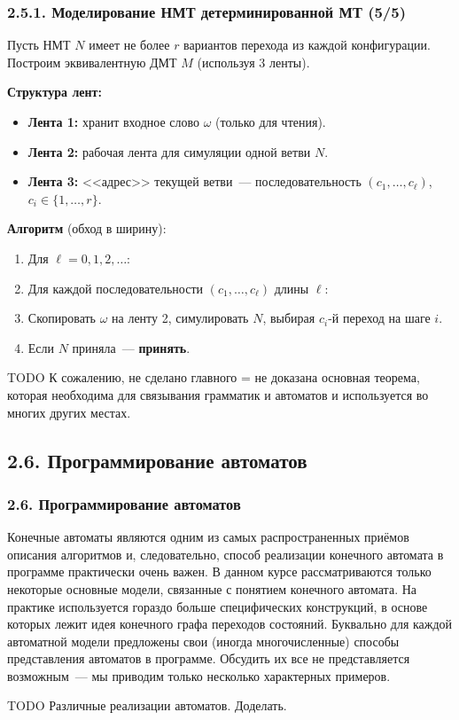 \documentclass[mathserif,12pt,aspectratio=169]{beamer}
\def\NB#1{{\bf\color{brown}#1}}
\def\TODO#1{{\color{gray} TODO {#1}}}
\begin{document}
\begin{frame}
\frametitle{2.5.1. Моделирование НМТ детерминированной МТ (5/5)}

\begin{example}
Пусть НМТ $N$ имеет не более $r$ вариантов перехода из каждой конфигурации.
Построим эквивалентную ДМТ $M$ (используя 3 ленты).

\NB{Структура лент:}
\begin{itemize}
\item \textbf{Лента 1:} хранит входное слово $\omega$ (только для чтения).
\item \textbf{Лента 2:} рабочая лента для симуляции одной ветви $N$.
\item \textbf{Лента 3:} <<адрес>> текущей ветви~--- последовательность $(c_1, \ldots, c_\ell)$, $c_i \in \{1, \ldots, r\}$.
\end{itemize}

\NB{Алгоритм} (обход в ширину):
\begin{enumerate}
\item Для $\ell = 0, 1, 2, \ldots$:
\item \quad Для каждой последовательности $(c_1, \ldots, c_\ell)$ длины $\ell$:
\item \quad \quad Скопировать $\omega$ на ленту 2, симулировать $N$, выбирая $c_i$-й переход на шаге $i$.
\item \quad \quad Если $N$ приняла~--- \textbf{принять}.
\end{enumerate}
\end{example}

\bigskip
\TODO{К сожалению, не сделано главного = не доказана основная теорема, которая 
необходима для связывания грамматик и автоматов и используется во многих других местах.}

\end{frame}



\subsection{2.6. Программирование автоматов}
\begin{frame}
\frametitle{2.6. Программирование автоматов}

Конечные автоматы являются одним из самых распространенных приёмов
описания алгоритмов и, следовательно, способ реализации конечного
автомата в программе практически очень важен. В данном курсе
рассматриваются только некоторые основные модели, связанные с понятием
конечного автомата. На практике используется гораздо больше
специфических конструкций, в основе которых лежит идея конечного
графа переходов состояний. Буквально для каждой автоматной модели предложены свои
(иногда многочисленные) способы представления автоматов в
программе. Обсудить их все не представляется возможным~--- мы
приводим только несколько характерных примеров.

\medskip
\TODO{Различные реализации автоматов. Доделать. }
\end{frame}
\end{document}
